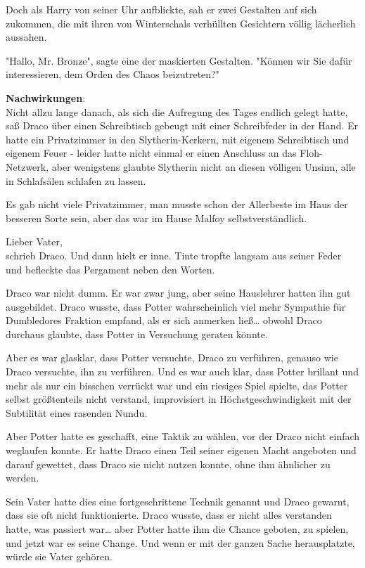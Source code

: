 {Doch als Harry von seiner Uhr aufblickte, sah er zwei Gestalten auf sich zukommen, die mit ihren von Winterschals verhüllten Gesichtern völlig lächerlich aussahen.

"Hallo, Mr. Bronze", sagte eine der maskierten Gestalten. "Können wir Sie dafür interessieren, dem Orden des Chaos beizutreten?"

\textbf{Nachwirkungen}:\\ Nicht allzu lange danach, als sich die Aufregung des Tages endlich gelegt hatte, saß Draco über einen Schreibtisch gebeugt mit einer Schreibfeder in der Hand. Er hatte ein Privatzimmer in den Slytherin-Kerkern, mit eigenem Schreibtisch und eigenem Feuer - leider hatte nicht einmal er einen Anschluss an das Floh-Netzwerk, aber wenigstens glaubte Slytherin nicht an diesen völligen Unsinn, alle in Schlafsälen schlafen zu lassen.

Es gab nicht viele Privatzimmer, man musste schon der Allerbeste im Haus der besseren Sorte sein, aber das war im Hause Malfoy selbstverständlich.

Lieber Vater,\\ schrieb Draco. Und dann hielt er inne. Tinte tropfte langsam aus seiner Feder und befleckte das Pergament neben den Worten.

Draco war nicht dumm. Er war zwar jung, aber seine Hauslehrer hatten ihn gut ausgebildet. Draco wusste, dass Potter wahrscheinlich viel mehr Sympathie für Dumbledores Fraktion empfand, als er sich anmerken ließ… obwohl Draco durchaus glaubte, dass Potter in Versuchung geraten könnte.

Aber es war glasklar, dass Potter versuchte, Draco zu verführen, genauso wie Draco versuchte, ihn zu verführen. Und es war auch klar, dass Potter brillant und mehr als nur ein bisschen verrückt war und ein riesiges Spiel spielte, das Potter selbst größtenteils nicht verstand, improvisiert in Höchstgeschwindigkeit mit der Subtilität eines rasenden Nundu.

Aber Potter hatte es geschafft, eine Taktik zu wählen, vor der Draco nicht einfach weglaufen konnte. Er hatte Draco einen Teil seiner eigenen Macht angeboten und darauf gewettet, dass Draco sie nicht nutzen konnte, ohne ihm ähnlicher zu werden.

Sein Vater hatte dies eine fortgeschrittene Technik genannt und Draco gewarnt, dass sie oft nicht funktionierte. Draco wusste, dass er nicht alles verstanden hatte, was passiert war… aber Potter hatte ihm die Chance geboten, zu spielen, und jetzt war es seine Change. Und wenn er mit der ganzen Sache herausplatzte, würde sie Vater gehören.

}
